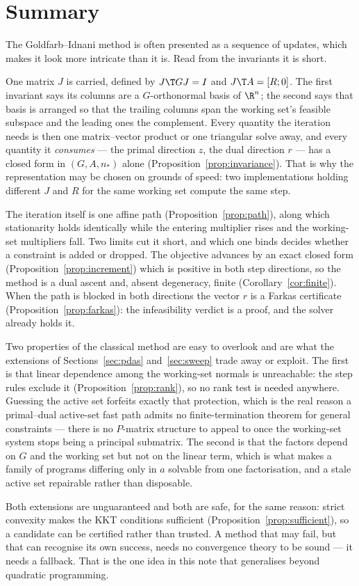 \section{Summary}
\label{sec:conclusions}

The Goldfarb--Idnani method is often presented as a sequence of updates, which
makes it look more intricate than it is. Read from the invariants it is short.

One matrix $J$ is carried, defined by $J\T G J = I$ and $J\T A = [R;0]$. The first
invariant says its columns are a $G$-orthonormal basis of $\R^n$; the second says
that basis is arranged so that the trailing columns span the working set's
feasible subspace and the leading ones the complement. Every quantity the
iteration needs is then one matrix--vector product or one triangular solve away,
and every quantity it \emph{consumes} --- the primal direction $z$, the dual
direction $r$ --- has a closed form in $(G, A, n_*)$ alone
(Proposition~\ref{prop:invariance}). That is why the representation may be chosen
on grounds of speed: two implementations holding different $J$ and $R$ for the same
working set compute the same step.

The iteration itself is one affine path (Proposition~\ref{prop:path}), along which
stationarity holds identically while the entering multiplier rises and the
working-set multipliers fall. Two limits cut it short, and which one binds decides
whether a constraint is added or dropped. The objective advances by an exact
closed form (Proposition~\ref{prop:increment}) which is positive in both step
directions, so the method is a dual ascent and, absent degeneracy, finite
(Corollary~\ref{cor:finite}). When the path is blocked in both directions the
vector $r$ is a Farkas certificate (Proposition~\ref{prop:farkas}): the
infeasibility verdict is a proof, and the solver already holds it.

Two properties of the classical method are easy to overlook and are what the
extensions of Sections~\ref{sec:pdas} and~\ref{sec:sweep} trade away or exploit.
The first is that linear dependence among the working-set normals is unreachable:
the step rules exclude it (Proposition~\ref{prop:rank}), so no rank test is
needed anywhere. Guessing the active set forfeits exactly that protection, which
is the real reason a primal--dual active-set fast path admits no
finite-termination theorem for general constraints --- there is no $P$-matrix
structure to appeal to once the working-set system stops being a principal
submatrix. The second is that the factors depend on $G$ and the working set but
not on the linear term, which is what makes a family of programs differing only in
$a$ solvable from one factorisation, and a stale active set repairable rather than
disposable.

Both extensions are unguaranteed and both are safe, for the same reason: strict
convexity makes the KKT conditions sufficient (Proposition~\ref{prop:sufficient}),
so a candidate can be certified rather than trusted. A method that may fail, but
that can recognise its own success, needs no convergence theory to be sound --- it
needs a fallback. That is the one idea in this note that generalises beyond
quadratic programming.
